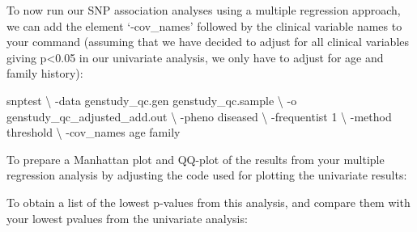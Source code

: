 \documentclass[]{book}
\newenvironment{Shaded}{\begin{snugshade}}{\end{snugshade}}
\newcommand{\StringTok}[1]{\textcolor[rgb]{0.31,0.60,0.02}{#1}}
\newcommand{\FunctionTok}[1]{\textcolor[rgb]{0.00,0.00,0.00}{#1}}
\newcommand{\OperatorTok}[1]{\textcolor[rgb]{0.81,0.36,0.00}{\textbf{#1}}}
\newcommand{\BuiltInTok}[1]{#1}
\newcommand{\ExtensionTok}[1]{#1}
\newcommand{\NormalTok}[1]{#1}
\begin{document}
To now run our SNP association analyses using a multiple regression
approach, we can add the element `-cov\_names' followed by the clinical
variable names to your command (assuming that we have decided to adjust
for all clinical variables giving p\textless{}0.05 in our univariate
analysis, we only have to adjust for age and family history):

\begin{Shaded}
\begin{Highlighting}[]
\ExtensionTok{snptest}\NormalTok{ \textbackslash{}}
\NormalTok{-data genstudy_qc.gen genstudy_qc.sample \textbackslash{}}
\NormalTok{-o genstudy_qc_adjusted_add.out \textbackslash{}}
\NormalTok{-pheno diseased \textbackslash{}}
\NormalTok{-frequentist 1 \textbackslash{}}
\NormalTok{-method threshold \textbackslash{}}
\NormalTok{-cov_names age family}
\end{Highlighting}
\end{Shaded}

To prepare a Manhattan plot and QQ-plot of the results from your
multiple regression analysis by adjusting the code used for plotting the
univariate results:

\begin{Shaded}
\end{Shaded}

To obtain a list of the lowest p-values from this analysis, and compare
them with your lowest pvalues from the univariate analysis:

\begin{Shaded}
\end{Shaded}
\end{document}
